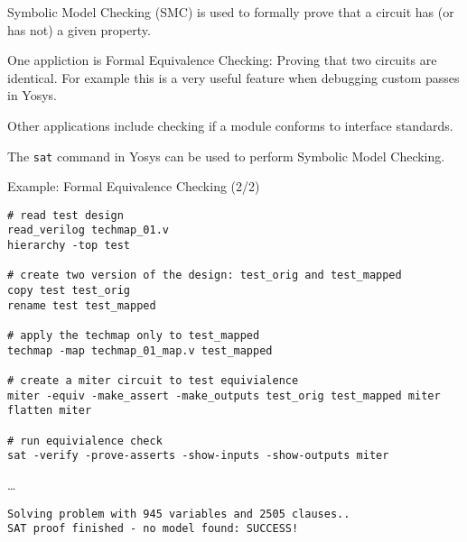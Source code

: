 \begin{frame}
\subsectionpage
\subsectionpagesuffix
\end{frame}

\begin{frame}{\subsecname}
Symbolic Model Checking (SMC) is used to formally prove that a circuit has
(or has not) a given property.

\bigskip
One appliction is Formal Equivalence Checking: Proving that two circuits
are identical. For example this is a very useful feature when debugging custom
passes in Yosys.

\bigskip
Other applications include checking if a module conforms to interface
standards.

\bigskip
The {\tt sat} command in Yosys can be used to perform Symbolic Model Checking.
\end{frame}


\begin{frame}[t, fragile]{Example: Formal Equivalence Checking (2/2)}
\begin{lstlisting}[basicstyle=\ttfamily\fontsize{8pt}{10pt}\selectfont, language=ys, frame=single]
# read test design
read_verilog techmap_01.v
hierarchy -top test

# create two version of the design: test_orig and test_mapped
copy test test_orig
rename test test_mapped

# apply the techmap only to test_mapped
techmap -map techmap_01_map.v test_mapped

# create a miter circuit to test equivialence
miter -equiv -make_assert -make_outputs test_orig test_mapped miter
flatten miter

# run equivialence check
sat -verify -prove-asserts -show-inputs -show-outputs miter
\end{lstlisting}

\dots
\begin{lstlisting}[basicstyle=\ttfamily\fontsize{8pt}{10pt}\selectfont]
Solving problem with 945 variables and 2505 clauses..
SAT proof finished - no model found: SUCCESS!
\end{lstlisting}
\end{frame}


